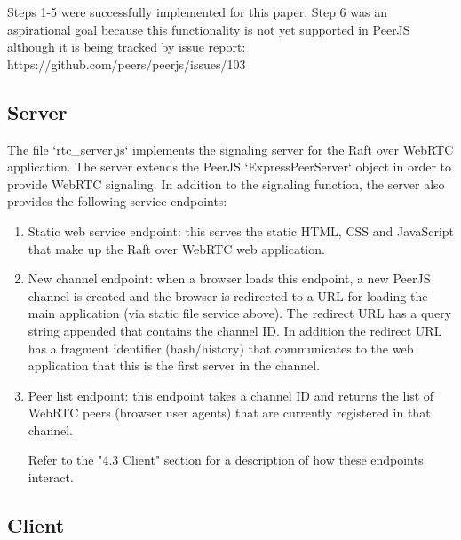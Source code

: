 \documentclass{acmtog} %
\begin{document}
Steps 1-5 were successfully implemented for this paper. Step 6 was an
aspirational goal because this functionality is not yet supported in
PeerJS although it is being tracked by issue report:
https://github.com/peers/peerjs/issues/103

\subsection{Server}

The file `rtc\_server.js` implements the signaling server for the Raft
over WebRTC application. The server extends the PeerJS
`ExpressPeerServer` object in order to provide WebRTC signaling. In
addition to the signaling function, the server also provides the
following service endpoints:

\begin{enumerate}
\item Static web service endpoint: this serves the static HTML, CSS and JavaScript that make up the Raft over WebRTC web application.

\item New channel endpoint: when a browser loads this endpoint, a new PeerJS channel is created and the browser is redirected to a URL for loading the main application (via static file service above).  The redirect URL has a query string appended that contains the channel ID. In addition the redirect URL has a fragment identifier (hash/history) that communicates to the web application that this is the first server in the channel.

\item Peer list endpoint: this endpoint takes a channel ID and returns the list of WebRTC peers (browser user agents) that are currently registered in that channel.

Refer to the "4.3 Client" section for a description of how these
endpoints interact.
\end{enumerate}

\subsection{Client}
\end{document}
